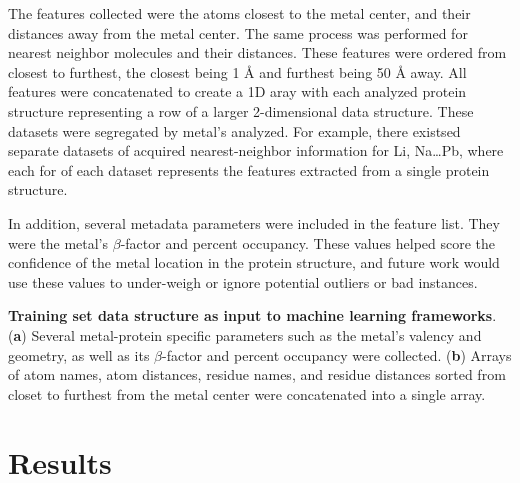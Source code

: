 \documentclass[../main/main]{subfiles}
\begin{document}
The features collected were the atoms closest to the metal center, and their distances away from the metal center. The same process was performed for nearest neighbor molecules and their distances. These features were ordered from closest to furthest, the closest being 1 \AA{} and furthest being 50 \AA{} away. All features were concatenated to create a 1D aray with each analyzed protein structure representing a row of a larger 2-dimensional data structure. These datasets were segregated by metal's analyzed. For example, there existsed separate datasets of acquired nearest-neighbor information for Li, Na\ldots{}Pb, where each for of each dataset represents the features extracted from a single protein structure.

In addition, several metadata parameters were included in the feature list. They were the metal's $\beta$-factor and percent occupancy. These values helped score the confidence of the metal location in the protein structure, and future work would use these values to under-weigh or ignore potential outliers or bad instances.

\begin{table}[H]
	\begin{subtable}[H]{\columnwidth}
		\caption{}
		\centering
		\footnotesize
		
	\end{subtable}
	\begin{subtable}[H]{\columnwidth}
		\caption{}
		\footnotesize
		
	\end{subtable}
	\caption[Training set data structure as input to machine learning frameworks]
	{
		\textbf{Training set data structure as input to machine learning frameworks}.
		(\textbf{a}) Several metal-protein specific parameters such as the metal's valency and geometry, as well as its $\beta$-factor and percent occupancy were collected.
		(\textbf{b}) Arrays of atom names, atom distances, residue names, and residue distances sorted from closet to furthest from the metal center were concatenated into a single array.
	}
	\label{\inputtable{C}{3}}
\end{table}

\section{Results}
\end{document}
